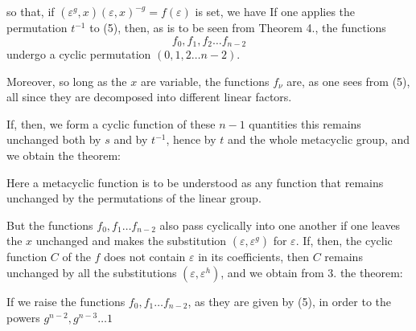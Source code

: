so that, if $(\varepsilon^{g}, x)(\varepsilon, x)^{-g} = f(\varepsilon)$ is set, we have
If one applies the permutation $t^{-1}$ to (5), then, as is to be seen from Theorem 4., the functions
\[
f_0, f_1, f_2 \ldots f_{n-2}
\]
undergo a cyclic permutation $(0, 1, 2 \ldots n-2)$.

Moreover, so long as the $x$ are variable, the functions $f_\nu$ are, as one sees from (5), all  since they are decomposed into different linear factors.

If, then, we form a cyclic function of these $n-1$ quantities
this remains unchanged both by $s$ and by $t^{-1}$, hence by $t$ and the whole metacyclic group, and we obtain the theorem:


Here a metacyclic function is to be understood as any function that remains unchanged by the permutations of the linear group.

But the functions $f_0, f_1 \ldots f_{n-2}$ also pass cyclically into one another if one leaves the $x$ unchanged and makes the substitution $(\varepsilon, \varepsilon^g)$ for $\varepsilon$. If, then, the cyclic function $C$ of the $f$ does not contain $\varepsilon$ in its coefficients, then $C$ remains unchanged by all the substitutions $(\varepsilon, \varepsilon^h)$, and we obtain from 3. the theorem:


If we raise the functions $f_0, f_1 \ldots f_{n-2}$, as they are given by (5), in order to the powers $g^{n-2}, g^{n-3} \ldots 1$
